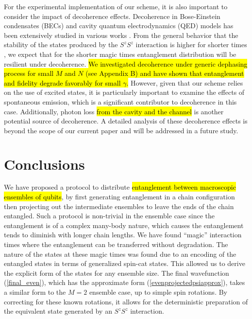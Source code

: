 \documentclass{WileyMSP-template}
\begin{document}
{For the experimental implementation of our scheme, it is also important to consider the impact of decoherence effects. Decoherence in Bose-Einstein condensates (BECs) and cavity quantum electrodynamics (QED) models has been extensively studied in various works \cite{Anglin1997,Burt1997,Dalvit2000,Ferrini2011,Li2008,Li2009,Pellizzari1995,Putz2014,Sinatra1998,Schlosshauer2019}. From the general behavior that the stability of the states produced by the $ S^z S^z $ interaction is higher for shorter times \cite{byrnes2013fractality}, we expect that for the shorter magic times entanglement distribution will be resilient under decoherence. \hl{We investigated decoherence under generic dephasing process for small $M$ and $N$ (see Appendix B) and have shown that entanglement and fidelity degrade favorably for small $\gamma$.} However, given that our scheme relies on the use of excited states, it is particularly important to examine the effects of spontaneous emission, which is a significant contributor to decoherence in this case. Additionally, photon loss \hl{from the cavity and the channel} is another potential source of decoherence. A detailed analysis of these decoherence effects is beyond the scope of our current paper and will be addressed in a future study.




\section{Conclusions}

We have proposed a protocol to distribute \hl{entanglement between macroscopic ensembles of qubits}, by first generating entanglement in a chain configuration then projecting out the intermediate ensembles to leave the ends of the chain entangled.  Such a protocol is non-trivial in the ensemble case since the entanglement is of a complex many-body nature, which causes the entanglement tends to diminish with longer chain lengths.  We have found ``magic'' interaction times where the entanglement can be transferred without degradation.  The nature of the states at these magic times was found due to an encoding of the entangled states in terms of generalized spin-cat states.  This allowed us to derive the explicit form of the states for any ensemble size. The final wavefunction (\ref{final_even}), which has the approximate form (\ref{evenprojectedpsiapprox}), takes a similar form to the $ M = 2 $ ensemble case, up to simple spin rotations.  By correcting for these known rotations, it allows for the deterministic preparation of the equivalent state generated by an $ S^z S^z $ interaction.

}
\end{document}
